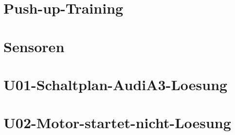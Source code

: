 \chapter{Push-up-Training}
%
\chapter{Sensoren}
%
\chapter{U01-Schaltplan-AudiA3-Loesung}
%
\chapter{U02-Motor-startet-nicht-Loesung}
%



%
%



%



